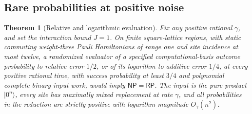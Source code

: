 \documentclass[11pt,reqno]{amsart}
\numberwithin{equation}{section}
\newtheorem{theorem}{Theorem}[section]
\theoremstyle{definition}
\theoremstyle{remark}
\newcommand{\ket}[1]{\lvert#1\rangle}
\begin{document}
\subsection{Rare probabilities at positive noise}
\begin{theorem}[Relative and logarithmic evaluation]\label{thm:rare}
Fix any positive rational $\gamma$, and set the interaction bound $J=1$. On finite square-lattice regions, with static commuting weight-three Pauli Hamiltonians of range one and site incidence at most twelve, a randomized evaluator of a specified computational-basis outcome probability to relative error $1/2$, or of its logarithm to additive error $1/4$, at every positive rational time, with success probability at least $3/4$ and polynomial complete binary input work, would imply $\mathsf{NP}=\mathsf{RP}$. The input is the pure product $\ket{0^n}$, every site has maximally mixed replacement at rate $\gamma$, and all probabilities in the reduction are strictly positive with logarithm magnitude $O_\gamma(n^2)$.
\end{theorem}
\end{document}
